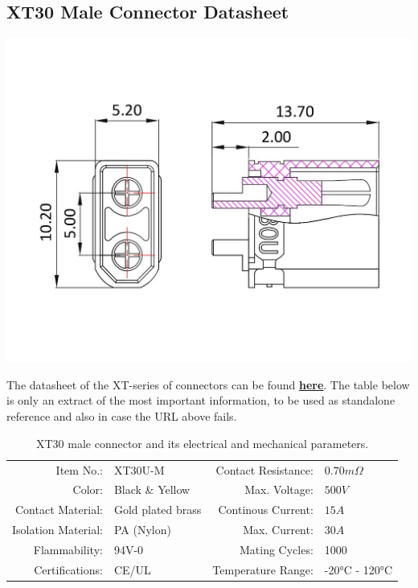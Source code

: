 \clearpage %
    \label{xt30}
\subsection{XT30 Male Connector Datasheet}

\includegraphics[width=\textwidth]{contents/figures/xt30_m.jpg}

The datasheet of the XT-series of connectors can be found \href{https://www.lcsc.com/datasheet/lcsc_datasheet_2304140030_Changzhou-Amass-Elec-XT30U-F_C99101.pdf}{\textbf{\underline{here}}}.
The table below is only an extract of the most important information, to be used as standalone reference and also in case the URL above fails.

\begin{table}[h] %
    \begin{tabular}{rlrl}
         Item No.:&  XT30U-M &  Contact Resistance:& $0.70m \Omega$\\
         Color:&  Black \& Yellow&  Max. Voltage:& $500V$\\
         Contact Material:&  Gold plated brass&  Continous Current:& $15A$\\
         Isolation Material:&  PA (Nylon)&  Max. Current:& $30A$\\
         Flammability:&  94V-0&  Mating Cycles:& 1000\\
         Certifications:&  CE/UL&  Temperature Range:& -20°C - 120°C\\
    \end{tabular}
    \caption{XT30 male connector and its electrical and mechanical parameters.}
    \label{xt30_m_specs}
\end{table}

